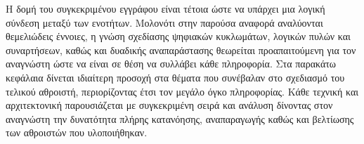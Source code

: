 Η δομή του συγκεκριμένου εγγράφου είναι τέτοια ώστε να υπάρχει μια λογική σύνδεση μεταξύ των ενοτήτων. Μολονότι στην παρούσα αναφορά αναλύονται θεμελιώδεις έννοιες, η γνώση σχεδίασης ψηφιακών κυκλωμάτων, λογικών πυλών και συναρτήσεων, καθώς και δυαδικής αναπαράστασης θεωρείται προαπαιτούμενη για τον αναγνώστη ώστε να είναι σε θέση να συλλάβει κάθε πληροφορία. Στα παρακάτω κεφάλαια δίνεται ιδιαίτερη προσοχή στα θέματα που συνέβαλαν στο σχεδιασμό του τελικού αθροιστή, περιορίζοντας έτσι τον μεγάλο όγκο πληροφορίας. Κάθε τεχνική και αρχιτεκτονική παρουσιάζεται με συγκεκριμένη σειρά και ανάλυση δίνοντας στον αναγνώστη την δυνατότητα πλήρης κατανόησης, αναπαραγωγής καθώς και βελτίωσης των αθροιστών που υλοποιήθηκαν.